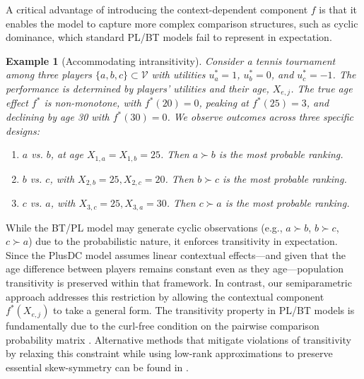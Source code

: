 \documentclass[
  12pt]{article}
\newtheorem{example}{Example}
\begin{document}
A critical advantage of introducing the context-dependent component $f$ is that it enables the model to capture more complex comparison structures, such as cyclic dominance, which standard PL/BT models fail to represent in expectation. 
\begin{example}[Accommodating intransitivity]
Consider a tennis tournament among three players $\{a, b, c\}\subset \mathcal{V}$ with utilities $u^*_a = 1$, $u^*_b = 0$, and $u^*_c = -1$. The performance is determined by players' utilities and their age, $X_{e,j}$. The true age effect $f^*$ is non-monotone, with $f^*(20)=0$, peaking at $f^*(25)=3$, and declining by age 30 with $f^*(30)=0$. We observe outcomes across three specific designs:

\begin{enumerate}
    \item $a$ vs. $b$, at age $X_{1,a}=X_{1,b}=25$. Then  $a\succ b$ is the most probable ranking.
\item $b$ vs. $c$, with $X_{2,b}=25,X_{2,c}=20$. Then $b\succ c$ is the most probable ranking.
 \item $c$ vs. $a$, with $X_{3,c}=25,X_{3,a}=30$. Then  $c\succ a$ is the most probable ranking.
\end{enumerate}
\end{example}

While the BT/PL model may generate cyclic observations (e.g., $a \succ b$, $b \succ c$, $c \succ a$) due to the probabilistic nature, it enforces transitivity in expectation. Since the PlusDC model assumes linear contextual effects—and given that the age difference between players remains constant even as they age—population transitivity is preserved within that framework. In contrast, our semiparametric approach addresses this restriction by allowing the contextual component $f^*(X_{e,j})$ to take a general form. The transitivity property in PL/BT models is fundamentally due to the curl-free condition on the pairwise comparison probability matrix \citep{lim2020hodge}. Alternative methods that mitigate violations of transitivity by relaxing this constraint while using low-rank approximations to preserve essential skew-symmetry can be found in \citet{lee2025pairwisetransitivity}.
\end{document}

